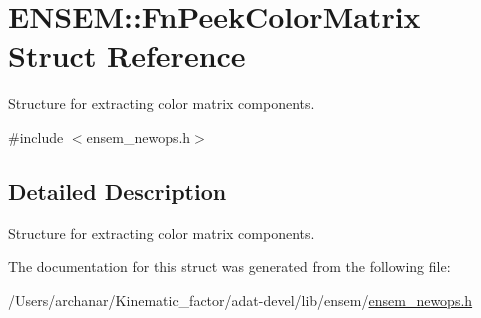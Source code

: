 \hypertarget{structENSEM_1_1FnPeekColorMatrix}{}\section{E\+N\+S\+EM\+:\+:Fn\+Peek\+Color\+Matrix Struct Reference}
\label{structENSEM_1_1FnPeekColorMatrix}


Structure for extracting color matrix components.  




{\ttfamily \#include $<$ensem\+\_\+newops.\+h$>$}



\subsection{Detailed Description}
Structure for extracting color matrix components. 

The documentation for this struct was generated from the following file\+:\begin{DoxyCompactItemize}
\item 
/\+Users/archanar/\+Kinematic\+\_\+factor/adat-\/devel/lib/ensem/\mbox{\hyperlink{adat-devel_2lib_2ensem_2ensem__newops_8h}{ensem\+\_\+newops.\+h}}\end{DoxyCompactItemize}
